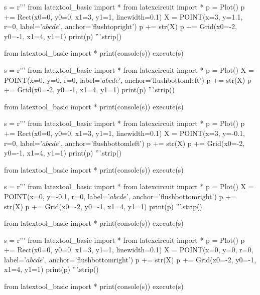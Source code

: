 \begin{python}
s = r'''
from latextool_basic import *
from latexcircuit import *
p = Plot()
p += Rect(x0=0, y0=0, x1=3, y1=1, linewidth=0.1)
X = POINT(x=3, y=1.1, r=0, label='$abcde$', anchor='flushtopright')
p += str(X)
p += Grid(x0=-2, y0=-1, x1=4, y1=1)
print(p)
'''.strip()

from latextool_basic import *
print(console(s))
execute(s)
\end{python}


\newpage
\begin{python}
s = r'''
from latextool_basic import *
from latexcircuit import *
p = Plot()
X = POINT(x=0, y=0, r=0, label='$abcde$', anchor='flushbottomleft')
p += str(X)
p += Grid(x0=-2, y0=-1, x1=4, y1=1)
print(p)
'''.strip()

from latextool_basic import *
print(console(s))
execute(s)
\end{python}

\begin{python}
s = r'''
from latextool_basic import *
from latexcircuit import *
p = Plot()
p += Rect(x0=0, y0=0, x1=3, y1=1, linewidth=0.1)
X = POINT(x=3, y=-0.1, r=0, label='$abcde$', anchor='flushbottomleft')
p += str(X)
p += Grid(x0=-2, y0=-1, x1=4, y1=1)
print(p)
'''.strip()

from latextool_basic import *
print(console(s))
execute(s)
\end{python}



\newpage
\begin{python}
s = r'''
from latextool_basic import *
from latexcircuit import *
p = Plot()
X = POINT(x=0, y=-0.1, r=0, label='$abcde$', anchor='flushbottomright')
p += str(X)
p += Grid(x0=-2, y0=-1, x1=4, y1=1)
print(p)
'''.strip()

from latextool_basic import *
print(console(s))
execute(s)
\end{python}


\begin{python}
s = r'''
from latextool_basic import *
from latexcircuit import *
p = Plot()
p += Rect(x0=0, y0=0, x1=3, y1=1, linewidth=0.1)
X = POINT(x=0, y=0, r=0, label='$abcde$', anchor='flushbottomright')
p += str(X)
p += Grid(x0=-2, y0=-1, x1=4, y1=1)
print(p)
'''.strip()

from latextool_basic import *
print(console(s))
execute(s)
\end{python}


